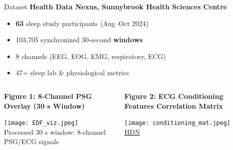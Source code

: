 \documentclass[aspectratio=169,11pt]{beamer}
\begin{document}
\begin{frame}{Dataset}
  \textbf{\textcolor{tcairemblue}{Health Data Nexus, Sunnybrook Health Sciences Centre}}
  \begin{itemize}
    \item \textbf{63} sleep study participants (Aug--Oct 2024)
    \item 103,705 synchronized 30-second \textbf{windows}
    \item 8 channels (EEG, EOG, EMG, respiratory, ECG)
    \item 47+ sleep lab \& physiological metrics
  \end{itemize}

  \begin{columns}[T,onlytextwidth]
    \begin{column}{0.6\textwidth}
      \centering
      {\footnotesize\textbf{Figure 1: 8-Channel PSG Overlay (30 s Window)}\par}
      \vspace{1ex}
      \texttt{[image: EDF\_viz.jpeg]}\\
      \tiny Processed 30 s window: 8-channel PSG/ECG signals
    \end{column}
    \begin{column}{0.38\textwidth}
      \centering
      {\footnotesize\textbf{Figure 2: ECG Conditioning Features Correlation Matrix}\par}
      \texttt{[image: conditioning\_mat.jpeg]}\\
      \tiny \href{https://doi.org/10.57764/tvsv-y363}{HDN}
    \end{column}
  \end{columns}
\end{frame}
\end{document}
